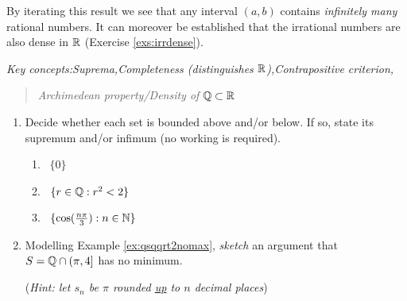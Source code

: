 
By iterating this result we see that any interval $(a,b)$ contains \emph{infinitely many} rational numbers. It can moreover be established that the irrational numbers are also dense in $\mathbb{R}$ (Exercise \ref{exs:irrdense}).




\begin{exercises}{}{}
	\emph{Key concepts:\quad Suprema,\quad Completeness (distinguishes $\mathbb{R}$),\quad Contrapositive criterion,}%
	\begin{quote}
		\emph{Archimedean property/Density of $\mathbb{Q}\subset\mathbb{R}$}
	\end{quote}
	
	\begin{enumerate}%
	  \item Decide whether each set is bounded above and/or below. If so, state its supremum and/or infimum (no working is required).
	  \begin{enumerate}
	    \item {}  \ $\{0\}$
	    \setcounter{enumii}{3}
	    \item {}  \ $\{r\in\mathbb{Q}:r^2<2\}$
	    \setcounter{enumii}{6}
	    \item {}  \ $\{\cos(\frac{n\pi}3):n\in\mathbb{N}\}$
  \end{enumerate}

  
  	\item Modelling Example \ref{ex:qsqqrt2nomax}, \emph{sketch} an argument that $S=\mathbb{Q}\cap (\pi,4]$ has no minimum.\par
  	(\emph{Hint: let $s_n$ be $\pi$ rounded \underline{up} to $n$ decimal places})
  
  
  	\goodbreak
  

\end{enumerate}
\end{exercises}
